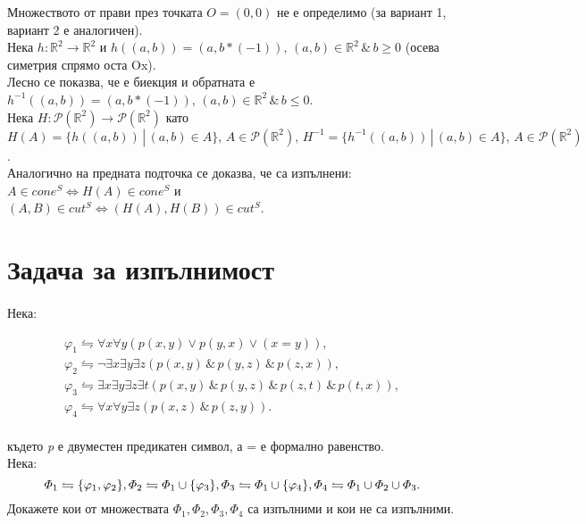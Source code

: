 \documentclass[12pt]{article}
\begin{document}
Множеството от прави през точката $O=(0,0)$ не е определимо (за вариант 1, вариант 2 е аналогичен).\\
Нека $h:\mathbb{R}^2 \rightarrow \mathbb{R}^2$ и 
$h((a,b)) = (a,b*(-1)),\, (a,b) \in \mathbb{R}^2\,\&\, b \ge 0$ (осева симетрия спрямо оста Ox).\\ 
Лесно се показва, че е биекция и обратната е $h^{-1}((a,b)) = (a,b*(-1)),\, (a,b) \in \mathbb{R}^2\,\&\, b \le 0$.\\
Нека $H:\mathcal{P}(\mathbb{R}^2)\rightarrow \mathcal{P}(\mathbb{R}^2)$ като $H(A) = \{h((a,b))\,|\,(a,b) \in A\},\,A \in \mathcal{P}(\mathbb{R}^2),\,  H^{-1} = \{h^{-1}((a,b))\,|\,(a,b) \in A\},\,A \in \mathcal{P}(\mathbb{R}^2)$.\\
Аналогично на предната подточка се доказва, че са изпълнени:\\
$A\in cone^S \iff H(A) \in cone^S$ и \\
$(A,B) \in cut^S \iff (H(A), H(B)) \in cut^S$.\\

\newpage
\section{Задача за изпълнимост}
\paragraph{}
Нека:
\begin{addmargin}[1em]{2em}
    \begin{gather*}
        \varphi_1 \leftrightharpoons \forall x \forall y(p(x,y)\lor p(y,x)\lor (x=y)),\\
        \varphi_2 \leftrightharpoons \neg \exists x\exists y\exists z(p(x,y)\,\&\,p(y,z)\,\&\,p(z,x)),\\
        \varphi_3 \leftrightharpoons \exists x\exists y\exists z\exists t (p(x,y)\,\&\,p(y,z)\,\&\,p(z,t)\,\&\,p(t,x)),\\
        \varphi_4 \leftrightharpoons \forall x \forall y \exists z (p(x,z)\,\&\,p(z,y)).\\
    \end{gather*}
\end{addmargin}
където \textit{p} е двуместен предикатен символ, а = е формално равенство.\\
Нека:
\begin{equation*}
    \varPhi_1\leftrightharpoons \{\varphi_1,\varphi_2\},\\
    \varPhi_2\leftrightharpoons \varPhi_1 \cup \{\varphi_3\}, \\
    \varPhi_3\leftrightharpoons \varPhi_1 \cup \{\varphi_4\},\\
    \varPhi_4\leftrightharpoons \varPhi_1 \cup \varPhi_2 \cup\varPhi_3.
\end{equation*}
Докажете кои от множествата $\varPhi_1, \varPhi_2, \varPhi_3, \varPhi_4$ са изпълними и кои не са изпълними.
\end{document}
